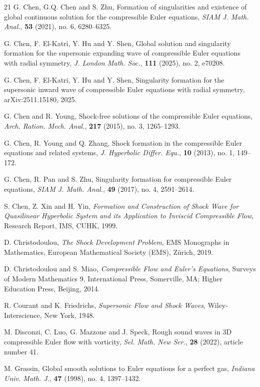 \documentclass[11pt,reqno]{article}
\numberwithin{equation}{section}
\begin{document}
\begin{thebibliography}{21}
 G. Chen, G.Q. Chen and S. Zhu, Formation of singularities and existence of
    global continuous solution for the compressible Euler equations, \emph{SIAM J. Math. Anal.},
{\bf 53} (2021), no. 6, 6280--6325.

 G. Chen, F. El-Katri, Y. Hu and Y. Shen, Global solution and singularity formation for
the supersonic expanding wave of compressible Euler equations with radial symmetry, \emph{J. London Math. Soc.}, {\bf 111} (2025), no. 2, e70208.

 G. Chen, F. El-Katri, Y. Hu and Y. Shen, Singularity formation for the supersonic inward wave of compressible Euler equations with radial symmetry, arXiv:2511.15180, 2025.

 G. Chen and R. Young, Shock-free solutions of the compressible Euler equations, \emph{Arch. Ration. Mech. Anal.}, {\bf 217} (2015), no. 3, 1265--1293.

 G. Chen, R. Young and Q. Zhang, Shock formation in the compressible Euler equations
and related systems, \emph{J. Hyperbolic Differ. Equ.}, {\bf 10} (2013), no. 1, 149--172.

 G. Chen, R. Pan and S. Zhu, Singularity formation for compressible Euler
    equations,  \emph{SIAM J. Math. Anal.}, {\bf 49} (2017), no. 4, 2591--2614.

 S. Chen, Z. Xin and H. Yin, \emph{Formation and Construction of Shock Wave for
Quasilinear Hyperbolic System and its Application to Inviscid Compressible Flow}, Research Report, IMS, CUHK, 1999.

 D. Christodoulou, \emph{The Shock Development Problem}, EMS Monographs in Mathematics,
European Mathematical Society (EMS), Z\"urich, 2019.

 D. Christodoulou and S. Miao, \emph{Compressible Flow and Euler's Equations}, Surveys of Modern Mathematics 9, International Press, Somerville, MA; Higher Education Press, Beijing, 2014.

 R. Courant and K. Friedrichs, \emph{Supersonic Flow
and Shock Waves}, Wiley-Interscience, New York, 1948.

 M. Disconzi, C. Luo, G. Mazzone and J. Speck, Rough sound waves in 3D compressible Euler
    flow with vorticity, \emph{Sel. Math. New Ser.}, {\bf 28} (2022), article number 41.

 M. Grassin, Global smooth solutions to Euler equations for a perfect gas, \emph{Indiana
    Univ. Math. J.},  {\bf 47} (1998), no. 4, 1397--1432.


\end{thebibliography}
\end{document}
